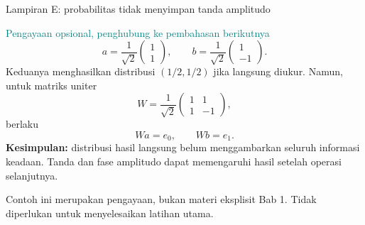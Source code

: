 \documentclass[aspectratio=169,11pt]{beamer}
\begin{document}
\begin{frame}{Lampiran E: probabilitas tidak menyimpan tanda amplitudo}
\small

\textcolor{teal}{\small Pengayaan opsional, penghubung ke pembahasan berikutnya}
\[
 a=\frac1{\sqrt2}\begin{pmatrix}1\\1\end{pmatrix},\qquad
 b=\frac1{\sqrt2}\begin{pmatrix}1\\-1\end{pmatrix}.
\]
Keduanya menghasilkan distribusi $(1/2,1/2)$ jika langsung diukur.
Namun, untuk matriks uniter
\[
 W=\frac1{\sqrt2}\begin{pmatrix}1&1\\1&-1\end{pmatrix},
\]
berlaku
\[
 Wa=e_0,\qquad Wb=e_1.
\]
\textbf{Kesimpulan:} distribusi hasil langsung belum menggambarkan seluruh informasi keadaan. Tanda dan fase amplitudo dapat memengaruhi hasil setelah operasi selanjutnya.
\par\medskip
\small Contoh ini merupakan pengayaan, bukan materi eksplisit Bab 1. Tidak diperlukan untuk menyelesaikan latihan utama.

\end{frame}
\end{document}
